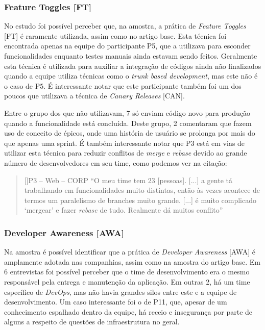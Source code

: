 \subsubsection{Feature Toggles [FT]}

No estudo foi possível perceber que, na amostra, a prática de \emph{Feature Toggles} [FT] é raramente utilizada, assim como no artigo base. Esta técnica foi encontrada apenas na equipe do participante P5, que a utilizava para esconder funcionalidades enquanto testes manuais ainda estavam sendo feitos. Geralmente esta técnica é utilizada para auxiliar a integração de códigos ainda não finalizados quando a equipe utiliza técnicas como o \emph{trunk based development}, mas este não é o caso de P5. É interessante notar que este participante também foi um dos poucos que utilizava a técnica de \emph{Canary Releases} [CAN].

Entre o grupo dos que não utilizavam, 7 só enviam código novo para produção quando a funcionalidade está concluída. Deste grupo, 2 comentaram que fazem uso de conceito de épicos, onde uma história de usuário se prolonga por mais do que apenas uma sprint. É também interessante notar que P3 está em vias de utilizar esta técnica para reduzir conflitos de \emph{merge} e \emph{rebase} devido ao grande número de desenvolvedores em seu time, como podemos ver na citação:

\begin{quotation}[]{P3 -- Web -- CORP}
    ``O meu time tem 23 [pessoas]. [...] a gente tá trabalhando em funcionalidades muito distintas, então às vezes acontece de termos um paralelismo de branches muito grande. [...] é muito complicado `mergear' e fazer \emph{rebase} de tudo. Realmente dá muitos conflito''
\end{quotation}


\subsubsection{Developer Awareness [AWA]}

Na amostra é possível identificar que a prática de \emph{Developer Awareness} [AWA] é amplamente adotada nas companhias, assim como na amostra do artigo base. Em 6 entrevistas foi possível perceber que o time de desenvolvimento era o mesmo responsável pela entrega e manutenção da aplicação. Em outras 2, há um time específico de \emph{DevOps}, mas não havia grandes silos entre este e a equipe de desenvolvimento. Um caso interessante foi o de P11, que, apesar de um conhecimento espalhado dentro da equipe, há receio e insegurança por parte de alguns a respeito de questões de infraestrutura no geral.


